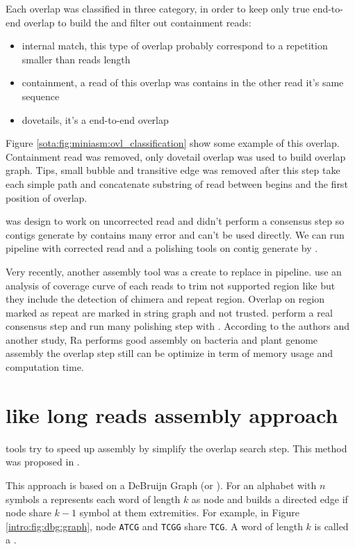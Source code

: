 \documentclass[main]{subfiles}
\begin{document}
Each overlap was classified in three category, in order to keep only true end-to-end overlap to build the \OLC and filter out containment reads:
\begin{itemize}
    \item internal match, this type of overlap probably correspond to a repetition smaller than reads length
    \item containment, a read of this overlap was contains in the other read it's same sequence
    \item dovetails, it's a end-to-end overlap
\end{itemize}
Figure \ref{sota:fig:miniasm:ovl_classification} show some example of this overlap. Containment read was removed, only dovetail overlap was used to build overlap graph. Tips, small bubble and transitive edge was removed after this step \miniasm take each simple path and concatenate substring of read between begins and the first position of overlap.

\miniasm was design to work on uncorrected read and didn't perform a consensus step so contigs generate by \miniasm contains many error and can't be used directly. We can run \minimap \miniasm pipeline with corrected read and a polishing tools on contig generate by \miniasm. 

Very recently, another assembly tool \cite{Ra} was a create to replace \miniasm in \minimap \miniasm pipeline.  use an analysis of coverage curve of each reads to trim not supported region like \miniasm but they include the detection of chimera and repeat region. Overlap on region marked as repeat are marked in string graph and not trusted.  perform a real consensus step and run many polishing step with . According to the authors and another study\cite{long_read_assembler_comparison}, Ra performs good assembly on bacteria and plant genome assembly the overlap step still can be optimize in term of memory usage and computation time.

\section{\DBG like long reads assembly approach} \label{section:sota:wtdbg}

\DBG tools try to speed up assembly by simplify the overlap search step. This method was proposed in  \cite{eulerian_approach}.

This approach is based on a DeBruijn Graph (or \DBG). For an alphabet with $n$ symbols a \DBG represents each word of length $k$ as node and builds a directed edge if node share $k - 1$ symbol at them extremities. For example, in Figure \ref{intro:fig:dbg:graph}, node \texttt{ATCG} and \texttt{TCGG} share \texttt{TCG}. A word of length $k$ is called a \kmer.
\end{document}
